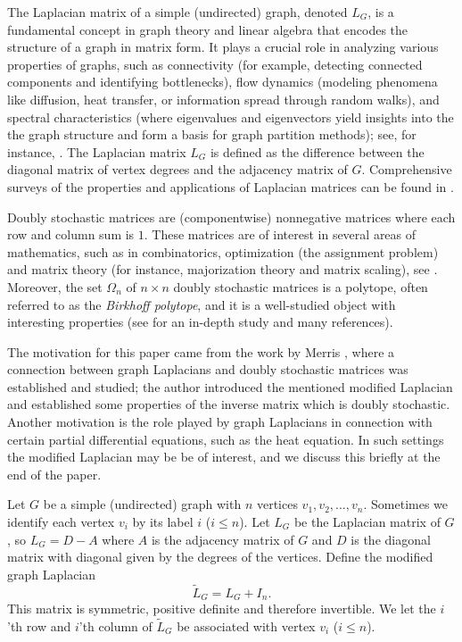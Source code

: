 \documentclass[12pt]{article}
\begin{document}
The Laplacian matrix of a simple (undirected) graph, denoted $L_G$, is a fundamental concept in graph theory and linear algebra that encodes the structure of a graph in matrix form. It plays a crucial role in analyzing various properties of graphs, such as connectivity (for example, detecting connected components and identifying bottlenecks), flow dynamics (modeling phenomena like diffusion, heat transfer, or information spread through random walks), and spectral characteristics (where eigenvalues and eigenvectors yield insights into the the graph structure and form a basis for graph partition methods); see, for instance, \cite{Fiedler_alg_conn, Fiedler2, Goerttler,Molitierno11}. The Laplacian matrix $L_G$ is defined as the difference between the diagonal matrix of vertex degrees and the adjacency matrix of $G$. Comprehensive surveys of the properties and applications of Laplacian matrices can be found in \cite{CHUNG, Merris94, Molitierno11}.

Doubly stochastic matrices are (componentwise) nonnegative matrices where each row and column sum is $1.$
These matrices are of interest in several areas of mathematics, such as in combinatorics, optimization (the assignment problem) and matrix theory (for instance, majorization theory and matrix scaling), see \cite{RAB06,MaOlAr11}. Moreover, the set $\Omega_n$ of $n \times n$ doubly stochastic matrices is a polytope, often referred to as the {\em Birkhoff polytope}, and it is a well-studied object with interesting properties (see \cite{RAB06} for an in-depth study and many references). 

The motivation for this paper came from the work by Merris \cite{Merris}, where a connection between graph Laplacians and doubly stochastic matrices  was established and studied; the author introduced  the mentioned modified Laplacian and established some properties of the inverse matrix which is  doubly stochastic. Another motivation is the role played by graph Laplacians in connection with certain partial differential equations, such as the heat equation. In such settings the modified Laplacian may be be of interest, and we discuss this briefly at the end of the paper.
\medskip

 Let $G$ be a  simple (undirected) graph with  $n$ vertices $v_1, v_2, \ldots, v_n$. Sometimes we identify each vertex $v_i$ by its label $i$ ($i \le n$). Let  $L_G$ be the Laplacian matrix of $G$, so $L_G=D-A$ where $A$ is the adjacency matrix of $G$ and $D$ is the diagonal matrix with diagonal given by the degrees of the vertices. Define the modified graph Laplacian 
 \[
    \tilde{L}_G=   L_G+I_n.
 \]
 This matrix is symmetric, positive definite and therefore invertible. 
 We let the $i$'th row and $i$'th column of $\tilde{L}_G$ be associated with vertex $v_i$ ($i \le n$). 
 
\end{document}
